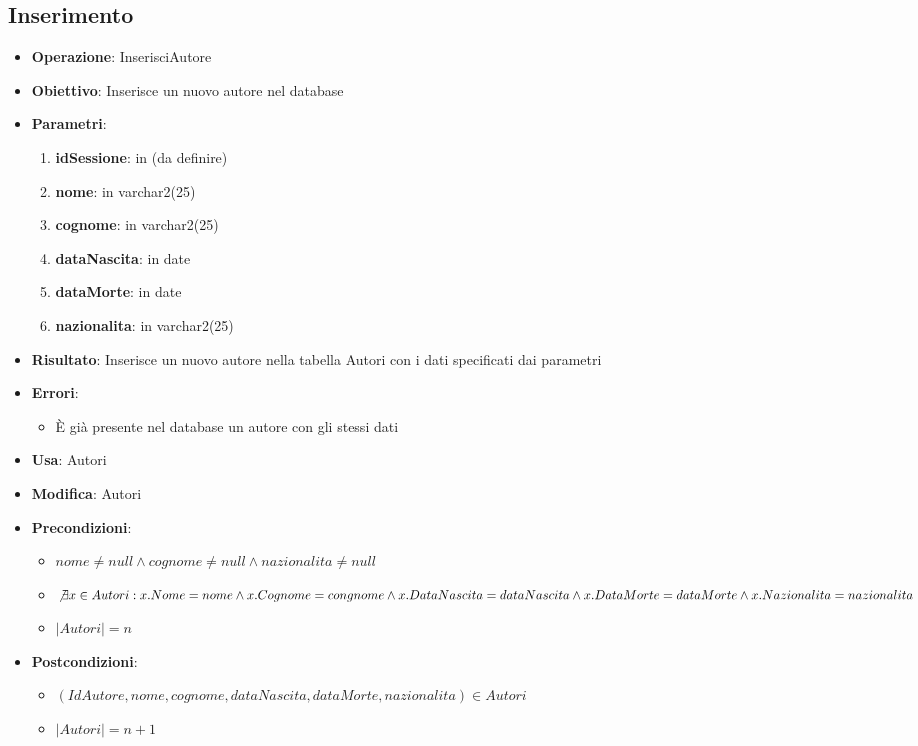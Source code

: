 \documentclass[a4paper,11pt]{article}
\begin{document}
\subsection{Inserimento}
\begin{itemize}
	\item \textbf{Operazione}: InserisciAutore
	\item \textbf{Obiettivo}: Inserisce un nuovo autore nel database
	\item \textbf{Parametri}:
	\begin{enumerate}
		\item \textbf{idSessione}: in (da definire)
		\item \textbf{nome}: in varchar2(25)
		\item \textbf{cognome}: in varchar2(25)
		\item \textbf{dataNascita}: in date
		\item \textbf{dataMorte}: in date
		\item \textbf{nazionalita}: in varchar2(25)
	\end{enumerate}
	\item \textbf{Risultato}: Inserisce un nuovo autore nella tabella Autori con i dati specificati dai parametri
	\item \textbf{Errori}: 
	\begin{itemize}
		\item È già presente nel database un autore con gli stessi dati
	\end{itemize}
	\item \textbf{Usa}: Autori
	\item \textbf{Modifica}: Autori
	\item \textbf{Precondizioni}:
	\begin{itemize}
		\item $nome \ne null \land cognome \ne null \land nazionalita \ne null$
		\item $\not\exists x \in Autori : x.Nome = nome \land x.Cognome = congnome 
		\land x.DataNascita = dataNascita \land x.DataMorte = dataMorte 
		\land x.Nazionalita = nazionalita$
		\item $|Autori| = n$
	\end{itemize}
	\item \textbf{Postcondizioni}:
	\begin{itemize}
		\item $(IdAutore,nome,cognome,dataNascita,dataMorte,nazionalita) \in Autori$
		\item $|Autori| = n + 1$
	\end{itemize}
\end{itemize}
\end{document}
